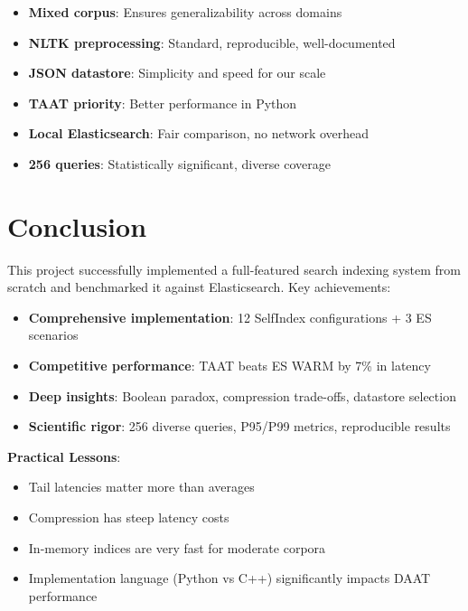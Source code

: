 \documentclass[12pt,a4paper]{article}
\begin{document}
\begin{itemize}
    \item \textbf{Mixed corpus}: Ensures generalizability across domains
    \item \textbf{NLTK preprocessing}: Standard, reproducible, well-documented
    \item \textbf{JSON datastore}: Simplicity and speed for our scale
    \item \textbf{TAAT priority}: Better performance in Python
    \item \textbf{Local Elasticsearch}: Fair comparison, no network overhead
    \item \textbf{256 queries}: Statistically significant, diverse coverage
\end{itemize}

\section{Conclusion}

This project successfully implemented a full-featured search indexing system from scratch and benchmarked it against Elasticsearch. Key achievements:

\begin{itemize}
    \item \textbf{Comprehensive implementation}: 12 SelfIndex configurations + 3 ES scenarios
    \item \textbf{Competitive performance}: TAAT beats ES WARM by 7\% in latency
    \item \textbf{Deep insights}: Boolean paradox, compression trade-offs, datastore selection
    \item \textbf{Scientific rigor}: 256 diverse queries, P95/P99 metrics, reproducible results
\end{itemize}

\textbf{Practical Lessons}:
\begin{itemize}
    \item Tail latencies matter more than averages
    \item Compression has steep latency costs
    \item In-memory indices are very fast for moderate corpora
    \item Implementation language (Python vs C++) significantly impacts DAAT performance
\end{itemize}
\end{document}
